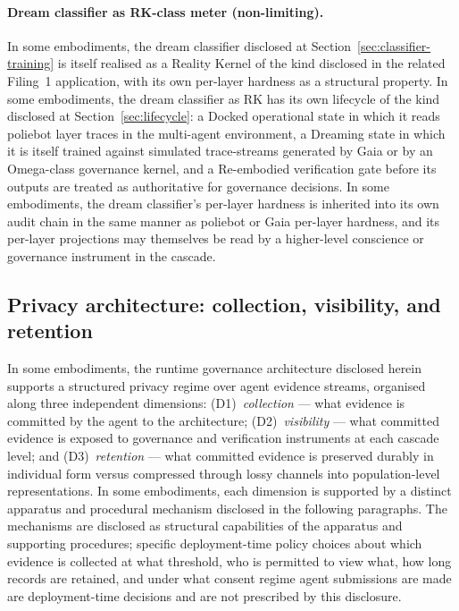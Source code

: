 \documentclass[a4paper,12pt]{article}
\newcommand{\RK}{Reality Kernel\xspace}
\begin{document}
\paragraph{Dream classifier as RK-class meter (non-limiting).}
In some embodiments, the dream classifier disclosed at
Section~\ref{sec:classifier-training} is itself realised as a
\RK of the kind disclosed in the related Filing~1 application, with its own
per-layer hardness as a structural property. In some embodiments, the
dream classifier as RK has its own lifecycle of the kind disclosed at
Section~\ref{sec:lifecycle}: a Docked operational state in which it
reads poliebot layer traces in the multi-agent environment, a
Dreaming state in which it is itself trained against simulated
trace-streams generated by Gaia or by an Omega-class governance
kernel, and a Re-embodied verification gate before its outputs are
treated as authoritative for governance decisions. In some
embodiments, the dream classifier's per-layer hardness is inherited
into its own audit chain in the same manner as poliebot or Gaia
per-layer hardness, and its per-layer projections may themselves be
read by a higher-level conscience or governance instrument in the
cascade.

\subsection{Privacy architecture: collection, visibility, and retention}
\label{sec:privacy-architecture}

In some embodiments, the runtime governance architecture disclosed
herein supports a structured privacy regime over agent evidence
streams, organised along three independent dimensions:
(D1)~\emph{collection} --- what evidence is committed by the agent
to the architecture;
(D2)~\emph{visibility} --- what committed evidence is exposed to
governance and verification instruments at each cascade level; and
(D3)~\emph{retention} --- what committed evidence is preserved
durably in individual form versus compressed through lossy channels
into population-level representations. In some embodiments, each
dimension is supported by a distinct apparatus and procedural
mechanism disclosed in the following paragraphs. The mechanisms are
disclosed as structural capabilities of the apparatus and supporting
procedures; specific deployment-time policy choices about which
evidence is collected at what threshold, who is permitted to view
what, how long records are retained, and under what consent regime
agent submissions are made are deployment-time decisions and are not
prescribed by this disclosure.
\end{document}
